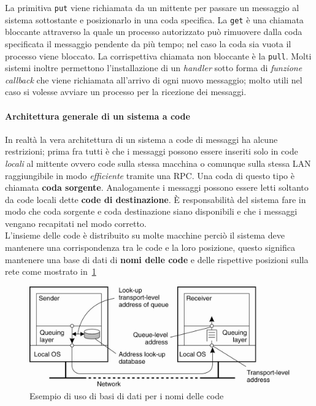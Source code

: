 La primitiva \texttt{put} viene richiamata da un mittente per passare un messaggio al sistema sottostante e posizionarlo in una coda specifica. La \texttt{get} è una chiamata bloccante attraverso la quale un processo autorizzato può rimuovere dalla coda specificata il messaggio pendente da più tempo; nel caso la coda sia vuota il processo viene bloccato. La corrispettiva chiamata non bloccante è la \texttt{pull}.
Molti sistemi inoltre permettono l'installazione di un \emph{handler} sotto forma di \emph{funzione callback} che viene richiamata all'arrivo di ogni nuovo messaggio; molto utili nel caso si volesse avviare un processo per la ricezione dei messaggi.
\paragraph{Architettura generale di un sistema a code}
In realtà la vera architettura di un sistema a code di messaggi ha alcune restrizioni; prima fra tutti è che i messaggi possono essere inseriti solo in code \emph{locali} al mittente ovvero code sulla stessa macchina o comunque sulla stessa LAN raggiungibile in modo \emph{efficiente} tramite una RPC. Una coda di questo tipo è chiamata \textbf{coda sorgente}.
Analogamente i messaggi possono essere letti soltanto da code locali dette \textbf{code di destinazione}. \uppercase{è} responsabilità del sistema fare in modo che coda sorgente e coda destinazione siano disponibili e che i messaggi vengano recapitati nel modo corretto. \\
L'insieme delle code è distribuito su molte macchine perciò il sistema deve mantenere una corrispondenza tra le code e la loro posizione, questo significa mantenere una base di dati di \textbf{nomi delle code} e delle rispettive posizioni sulla rete come mostrato in \figurename\,\ref{img:queeuename}
\begin{figure}
\centering
\includegraphics[scale=0.4]{img/queeuename.png}
\caption{Esempio di uso di basi di dati per i nomi delle code}\label{img:queeuename}
\end{figure}
